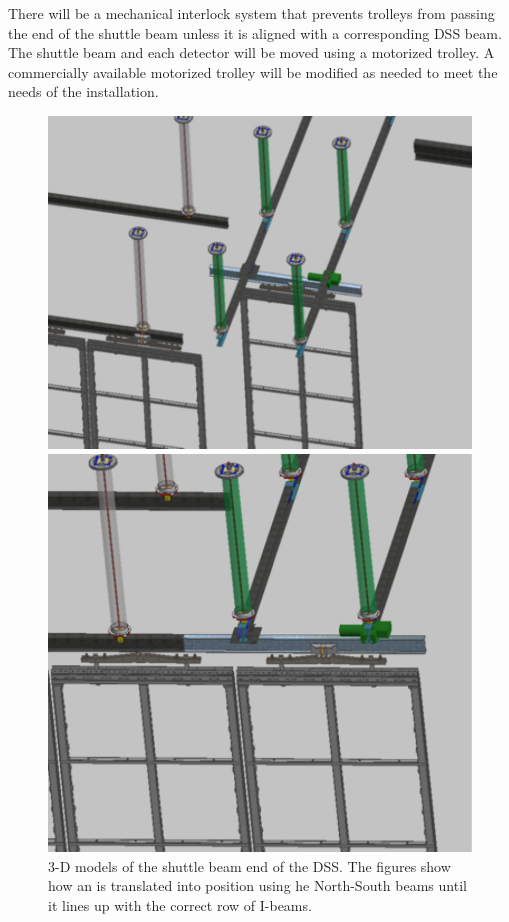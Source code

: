 There will be a mechanical interlock system that prevents trolleys
from passing the end of the shuttle beam unless it is aligned with a
corresponding DSS beam.  The shuttle beam and each detector will be
moved using a motorized trolley.  A commercially available motorized
trolley will be modified as needed to meet the needs of the
installation.
\begin{figure}[htbp]
\begin{center}
\begin{minipage}[c]{0.49\textwidth}
\includegraphics[width=\textwidth]{far-detector-single-phase/figures/Shuttle-1.pdf}
\end{minipage}
\begin{minipage}[c]{0.42\textwidth}
\includegraphics[width=\textwidth]{far-detector-single-phase/figures/shuttle-2.pdf}
\end{minipage}
\caption{3-D models of the shuttle beam end of the DSS. The figures show how an 
is translated into position using he North-South beams until it lines up with the correct
row of I-beams.}
\label{shuttle}
\end{center}
\end{figure}

